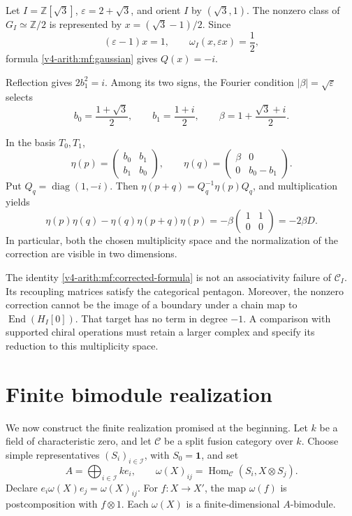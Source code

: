 \begin{example}\label{v4-arith:mf:order-two}
Let \(I=\mathbb Z[\sqrt3]\), \(\varepsilon=2+\sqrt3\),
and orient \(I\) by \((\sqrt3,1)\).
The nonzero class of \(G_I\simeq\mathbb Z/2\)
is represented by \(x=(\sqrt3-1)/2\).
Since
\[
 (\varepsilon-1)x=1,\qquad
 \omega_I(x,\varepsilon x)=\frac12,
\]
formula \eqref{v4-arith:mf:gaussian} gives \(Q(x)=-i\).

Reflection gives \(2b_1^2=i\).
Among its two signs, the Fourier condition
\(\lvert\beta\rvert=\sqrt\varepsilon\) selects
\[
 b_0=\frac{1+\sqrt3}{2},\qquad
 b_1=\frac{1+i}{2},\qquad
 \beta=1+\frac{\sqrt3+i}{2}.
\]

In the basis \(T_0,T_1\),
\[
 \eta(p)=
 \begin{pmatrix}b_0&b_1\\b_1&b_0\end{pmatrix},\qquad
 \eta(q)=
 \begin{pmatrix}\beta&0\\0&b_0-b_1\end{pmatrix}.
\]
Put \(Q_q=\operatorname{diag}(1,-i)\).
Then \(\eta(p+q)=Q_q^{-1}\eta(p)Q_q\), and multiplication yields
\[
 \eta(p)\eta(q)-\eta(q)\eta(p+q)\eta(p)
  =-\beta\begin{pmatrix}1&1\\0&0\end{pmatrix}
  =-2\beta D.
\]
In particular, both the chosen multiplicity space and the
normalization of the correction are visible in two dimensions.
\end{example}

The identity \eqref{v4-arith:mf:corrected-formula}
is not an associativity failure of \(\mathcal C_I\).
Its recoupling matrices satisfy the categorical pentagon.
Moreover, the nonzero correction cannot be the image of a boundary
under a chain map to \(\operatorname{End}(H_I[0])\).
That target has no term in degree \(-1\).
A comparison with supported chiral operations must retain a larger
complex and specify its reduction to this multiplicity space.

\section{Finite bimodule realization}
\label{v4-arith:mf:finite}

We now construct the finite realization promised at the beginning.
Let \(k\) be a field of characteristic zero, and let
\(\mathcal C\) be a split fusion category over \(k\).
Choose simple representatives \((S_i)_{i\in\mathcal I}\),
with \(S_0=\mathbf1\), and set
\[
 A=\bigoplus_{i\in\mathcal I}ke_i,\qquad
 \omega(X)_{ij}=
       \operatorname{Hom}_{\mathcal C}(S_i,X\otimes S_j).
\]
Declare \(e_i\omega(X)e_j=\omega(X)_{ij}\).
For \(f:X\to X'\), the map \(\omega(f)\) is postcomposition
with \(f\otimes1\).
Each \(\omega(X)\) is a finite-dimensional \(A\)-bimodule.

